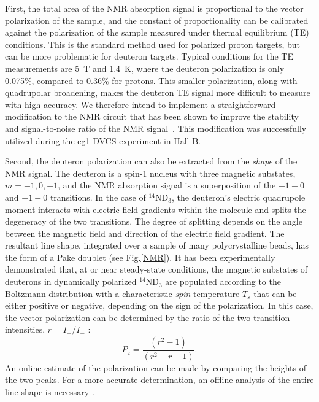 First, the total area of the NMR absorption signal is proportional to the vector polarization of the sample, and the constant of proportionality can be calibrated against the polarization of the sample measured under thermal equilibrium (TE) conditions.  This is the standard method used for polarized proton targets, but can be more problematic for deuteron targets.  Typical conditions for the TE measurements are 5~T and 1.4~K,
where the deuteron polarization is only 0.075\%, compared to 0.36\% for protons.
This smaller polarization, along with quadrupolar broadening, makes the deuteron TE signal more difficult to measure with high accuracy.
We therefore intend to implement a straightforward modification to the NMR circuit that has been shown to improve the stability and signal-to-noise ratio of the NMR signal~\cite{Court2004}. This modification was 
successfully utilized during the eg1-DVCS experiment in Hall B.  

Second, the deuteron polarization can also be extracted from the {\em shape\/} of the NMR signal.  
The deuteron is a spin-1 nucleus with three magnetic substates, $m=\minus1, 0, \plus1$, and the 
NMR absorption signal is a superposition of the $\minus 1-0$ and $\plus 1-0$ transitions.
In the case of ${}^{14}$ND$_3$, the deuteron's electric quadrupole moment interacts with electric field gradients within the molecule and splits the degeneracy of the two transitions.  The degree of splitting depends on the 
angle between the magnetic field and direction of the electric field gradient.  The resultant line shape, integrated over a sample of many polycrystalline beads, has the form of a Pake doublet (see Fig.\/\ref{NMR}).  
It has been experimentally demonstrated that, at or near steady-state conditions, the magnetic substates of deuterons in dynamically polarized ${}^{14}$ND$_3$ are populated according to the Boltzmann distribution with a characteristic {\em spin\/} temperature $T_s$ that can be either positive or negative, depending on the sign of the polarization. In this case, the vector polarization can be determined by the
ratio of the two transition intensities, $r=I_{\plus} / I_{\minus}$ \cite{Dulya1997}:
\begin{equation}
P_z = \frac{(r^2-1)}{(r^2 + r +1)}.
\end{equation}
An online estimate of the polarization can be made by comparing the heights of the two peaks.  
For a more accurate determination, an offline analysis of the entire line shape is necessary \cite{Dulya1997}.

